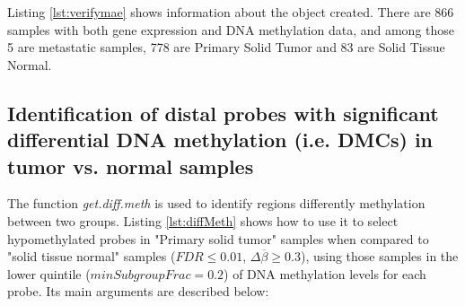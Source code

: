 

Listing \ref{lst:verifymae} shows information about the object created.
There are 866 samples with both gene expression and DNA methylation data,
and among those 5 are metastatic samples, 778 are Primary Solid Tumor and
83 are Solid Tissue Normal.





\subsection*{Identification of distal probes with significant differential DNA methylation (i.e. DMCs) in tumor vs. normal samples}

The function \textit{get.diff.meth} is  used to identify regions differently methylation between two groups.
Listing \ref{lst:diffMeth} shows how to use it to select hypomethylated probes in "Primary solid tumor" samples
when compared to "solid tissue normal" samples  ($FDR \leq 0.01$, $\Delta\overline{\beta}\geq 0.3$), using those samples
in the lower quintile ($minSubgroupFrac = 0.2$) of DNA methylation levels for each probe.
Its main arguments are described below:


